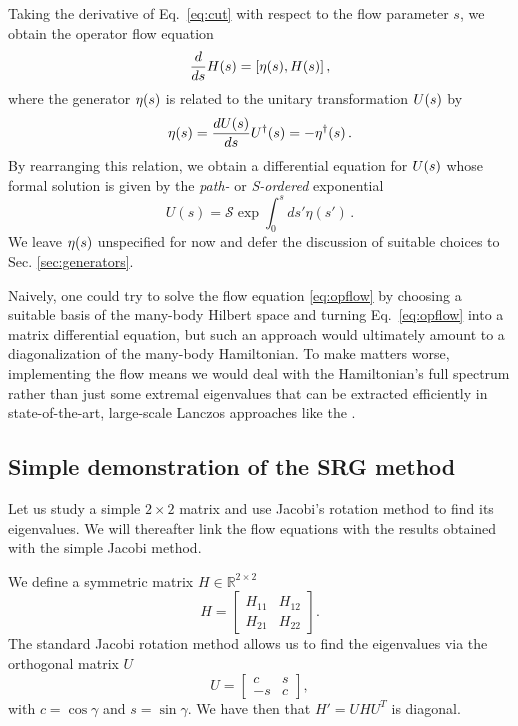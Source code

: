 Taking the derivative of Eq.~\eqref{eq:cut}
with respect to the flow parameter $s$, we obtain the operator flow equation
\begin{equation}\label{eq:opflow}
  \totd{}{s}\HO(s) = \comm{\etaO(s)}{\HO(s)}\,,
\end{equation} 
where the generator $\eta(s)$ is related to the unitary transformation $U(s)$ by
\begin{equation}
  \eta(s)= \frac{d {U(s)}} {d {s}} U^{\dag}(s) = -\eta^{\dag}(s)\,.
\end{equation}
By rearranging this relation, we obtain a differential equation for $U(s)$ whose formal solution is given by the \emph{path-}
or \emph{S-ordered} exponential
\begin{equation}
  U(s) = \mathcal{S}\exp \int^s_0 ds' \eta(s')\,.
\end{equation}
We leave $\eta(s)$ unspecified for now and defer the discussion of suitable choices to Sec. \ref{sec:generators}. 

Naively, one could try to solve the flow equation \eqref{eq:opflow} by
choosing a suitable basis of the many-body Hilbert space and turning
Eq.~\eqref{eq:opflow} into a matrix differential equation, but such an
approach would ultimately amount to a diagonalization of the many-body
Hamiltonian. To make matters worse, implementing the flow means we
would deal with the Hamiltonian's full spectrum rather than just some
extremal eigenvalues that can be extracted efficiently in
state-of-the-art, large-scale Lanczos approaches like the 
\cite{navratil2000,barrett2013}.

\subsection{Simple demonstration of the SRG method}
Let us study a simple $2\times 2$ matrix and use Jacobi's rotation method \cite{golubvanloan1996} to find its eigenvalues. 
We will thereafter link the flow equations
with the results obtained with the simple Jacobi method.

We define a  symmetric matrix  $H\in {\mathbb{R}}^{2\times 2}$
\[ H = \begin{bmatrix} H_{11} & H_{12} \\ H_{21} & H_{22}
\end{bmatrix}. \]
The standard Jacobi rotation method allows us to find the eigenvalues via the orthogonal matrix
$U$ 
\[ U = \begin{bmatrix} c & s \\ -s & c
\end{bmatrix}, \]
with $c = \cos \gamma$ and $s = \sin \gamma$. We have then that  $H' = UHU^T$ is diagonal. 

